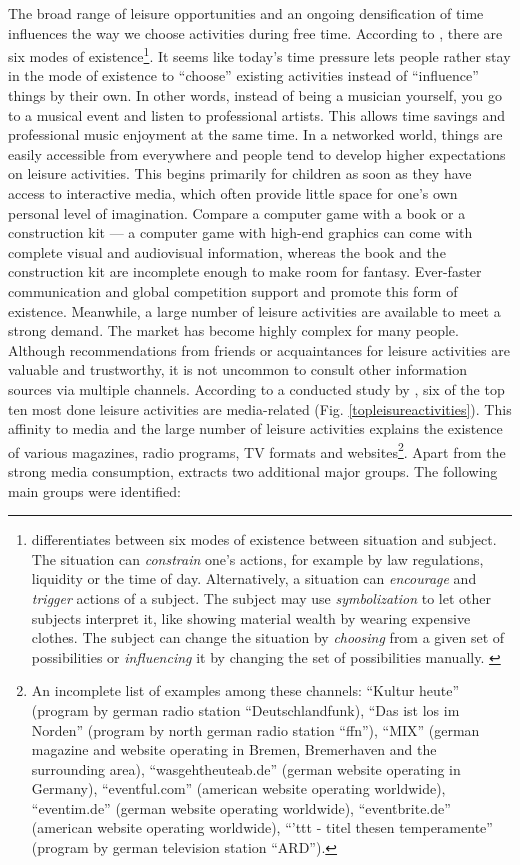 \documentclass[12pt,numbers=noenddot,parskip,bibliography=totocnumbered,listof=totocnumbered,draft]{scrreprt}
\begin{document}
The broad range of leisure opportunities and an ongoing densification of time influences the way we choose activities during free time. According to \citeauthor{schulze2005}, there are six modes of existence\footnote{\citeauthor{schulze2005} differentiates between six modes of existence between situation and subject. The situation can \textit{constrain} one's actions, for example by law regulations, liquidity or the time of day. Alternatively, a situation can \textit{encourage} and \textit{trigger} actions of a subject. The subject may use \textit{symbolization} to let other subjects interpret it, like showing material wealth by wearing expensive clothes. The subject can change the situation by \textit{choosing} from a given set of possibilities or \textit{influencing} it by changing the set of possibilities manually. \citep[p. 198-206]{schulze2005}}. It seems like today's time pressure lets people rather stay in the mode of existence to ``choose'' existing activities instead of ``influence'' things by their own. In other words, instead of being a musician yourself, you go to a musical event and listen to professional artists. This allows time savings and professional music enjoyment at the same time. In a networked world, things are easily accessible from everywhere and people tend to develop higher expectations on leisure activities. This begins primarily for children as soon as they have access to interactive media, which often provide little space for one's own personal level of imagination. Compare a computer game with a book or a construction kit — a computer game with high-end graphics can come with complete visual and audiovisual information, whereas the book and the construction kit are incomplete enough to make room for fantasy. Ever-faster communication and global competition support and promote this form of existence. Meanwhile, a large number of leisure activities are available to meet a strong demand. The market has become highly complex for many people. Although recommendations from friends or acquaintances for leisure activities are valuable and trustworthy, it is not uncommon to consult other information sources via multiple channels. According to a conducted study by \citeauthor{freizeitmonitor2016}, six of the top ten most done leisure activities are media-related (Fig. \ref{topleisureactivities}). This affinity to media and the large number of leisure activities explains the existence of various magazines, radio programs, TV formats and websites\footnote{An incomplete list of examples among these channels: ``Kultur heute'' (program by german radio station ``Deutschlandfunk), ``Das ist los im Norden'' (program by north german radio station ``ffn''), ``MIX'' (german magazine and website operating in Bremen, Bremerhaven and the surrounding area), ``wasgehtheuteab.de'' (german website operating in Germany), ``eventful.com'' (american website operating worldwide), ``eventim.de'' (german website operating worldwide), ``eventbrite.de'' (american website operating worldwide), ``'ttt - titel thesen temperamente'' (program by german television station ``ARD'').}. Apart from the strong media consumption, \citeauthor{freizeitmonitor2016} extracts two additional major groups. The following main groups were identified:
\end{document}
